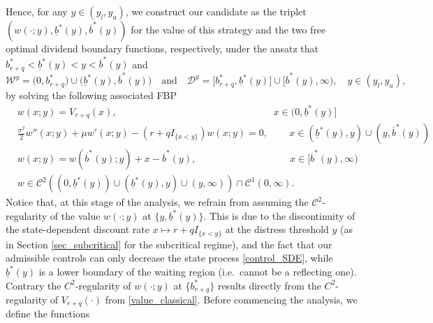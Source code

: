 \documentclass[11pt]{article} %
\newcommand{\ubar}[1]{\underaccent{\bar}{#1}}
\numberwithin{komcounter}{section}
\renewcommand{\ubar}{\underline}
\renewcommand{\bar}{\overline}
\numberwithin{equation}{section}
\numberwithin{theorem}{section}
\begin{document}
Hence, for any $y \in (y_l, y_u)$, we construct our candidate as the triplet $(w(\cdot;y), \underline{b}^*(y), \overline{b}^*(y))$ for the value of this strategy and the two free optimal dividend boundary functions, respectively, under the ansatz that $b^*_{r+q} < \underline{b}^*(y) < y < \overline{b}^*(y)$ and 
\begin{equation} \label{ac_wait_medy}
\mathcal{W}^y = \big(0,b^*_{r+q} \big) \cup \big(\underline{b}^*(y), \overline{b}^*(y) \big) 
\quad \text{and} \quad 
\mathcal{D}^y = \big[b^*_{r+q},  \underline{b}^*(y) \big] \cup \big[\overline{b}^*(y), \infty \big) , 
\quad y \in (y_l, y_u),
\end{equation}
by solving the following associated FBP 
\begin{align}
& w(x;y) = V_{r+q}(x), \qquad \qquad \qquad \qquad \qquad \qquad \qquad \qquad x\in (0,\ubar{b}^*(y)]\label{FBP_medya}\\
& \tfrac{\sigma^2}{2} w''(x;y) + \mu w'(x;y) - (r + q I_{\{x< y\}}) w(x;y) = 0, \qquad \, x \in (\ubar{b}^*(y),y) \cup (y,\bar{b}^*(y)) \label{FBP_medyc}\\
& w(x;y) = w(\bar{b}^*(y);y) + x - \bar{b}^*(y), \qquad \qquad \qquad \qquad \quad\;\; x\in [\bar{b}^*(y),\infty) \label{FBP_medyd}\\
& w \in \mathcal{C}^2((0,\ubar{b}^*(y)) \cup (\ubar{b}^*(y),y) \cup (y,\infty)) \cap \mathcal{C}^1(0,\infty) \label{FBP_medye}.
\end{align}
Notice that, at this stage of the analysis, we refrain from assuming the $\mathcal{C}^2$-regularity of the value $w(\cdot;y)$ at $\{y,\ubar{b}^*(y)\}$. 
This is due to the discontinuity of the state-dependent discount rate $x \mapsto r + q I_{\{x< y\}}$ at the distress threshold $y$ (as in Section \ref{sec_subcritical} for the  subcritical regime), 
and the fact that our admissible controls can only decrease the state process \eqref{control_SDE}, while $\ubar{b}^*(y)$ is a lower boundary of the waiting region (i.e.~cannot be a reflecting one). 
Contrary the $C^2$-regularity of $w(\cdot;y)$ at $\{b^*_{r+q}\}$ results directly from the $C^2$-regularity of $V_{r+q}(\cdot)$ from \eqref{value_classical}. Before commencing the analysis, we define the functions
\end{document}
